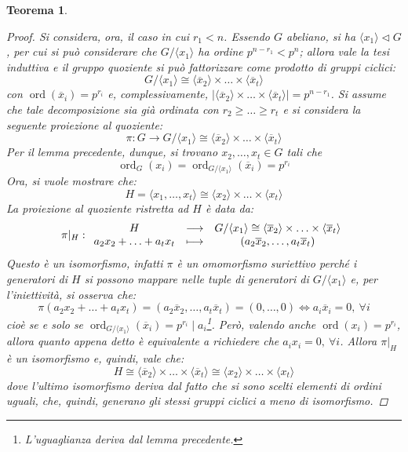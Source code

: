 \documentclass[11pt]{scrartcl}
\theoremstyle{style1}
\newtheorem{teorema}{Teorema}[section]
\numberwithin{equation}{subsection}
\begin{document}
\begin{teorema}
\begin{proof}
		Si considera, ora, il caso in cui $r_1<n$.
		Essendo $G$ abeliano, si ha $\langle x_1 \rangle \lhd G$, per cui si pu\`o considerare che $G / \langle x_1 \rangle$ ha ordine $p^{n-r_1} < p^n$; allora vale la tesi induttiva e il gruppo quoziente si pu\`o fattorizzare come prodotto di gruppi ciclici:
		\[
		G / \langle x_1 \rangle \cong \langle \overline{x}_2 \rangle\times \ldots\times \langle \overline{x}_t \rangle
		\] 
		con $\operatorname{ord}(\overline{x}_i) = p^{r_i} $ e, complessivamente, $\lvert \langle \overline{x}_2 \rangle\times \ldots\times \langle \overline{x}_t \rangle \rvert=p^{n-r_1}  $.
		Si assume che tale decomposizione sia gi\`a ordinata con $r_2\ge \ldots\ge r_t$ e si considera la seguente proiezione al quoziente:
		\[
		\pi : G \to G / \langle x_1 \rangle \cong \langle \overline{x}_2 \rangle\times \ldots\times \langle \overline{x}_t \rangle
		\] 
		Per il lemma precedente, dunque, si trovano $x_2,\ldots,x_t \in G$ tali che 
		\[
		\operatorname{ord}_G(x_i) =\operatorname{ord}_{G/\langle x_1 \rangle} (\overline{x}_i) = p^{r_i} 
		\] 
		Ora, si vuole mostrare che:
\[
H = \langle x_1,\ldots,x_t \rangle\cong \langle x_2 \rangle\times \ldots\times \langle x_t \rangle
\] 
La proiezione al quoziente ristretta ad $H$ \`e data da:
\[
\pi|_{H}  : 
	\begin{array}
		{c c c}
		H &\longrightarrow& G / \langle x_1 \rangle\cong \langle \overline{x}_2 \rangle\times \ldots\times \langle \overline{x}_t \rangle\\
		a_2x_2+\ldots+a_tx_t&\longmapsto& (a_2\overline{x}_2,\ldots,a_t \overline{x}_t)
	\end{array}
\] 
Questo \`e un isomorfismo, infatti $\pi$ \`e un omomorfismo suriettivo perch\'e i generatori di $H$ si possono mappare nelle tuple  di generatori di $G / \langle x_1 \rangle$ e, per l'iniettivit\`a, si osserva che:
\[
\pi(a_2x_2+ \ldots+a_t x_t) = (a_2\overline{x}_2,\ldots,a_t \overline{x}_t)= (0,\ldots,0) \iff a_i \overline{x}_i = 0, \ \forall i
\] 
cio\`e se e solo se $\operatorname{ord}_{G/\langle x_1 \rangle} (\overline{x}_i) = p^{r_i}  \mid a_i $\footnote{L'uguaglianza deriva dal lemma precedente.}.
Per\`o, valendo anche $\operatorname{ord}(x_i) =p^{r_i} $, allora quanto appena detto \`e equivalente a richiedere che $a_i x_ i= 0 , \ \forall i$.
Allora $\pi|_{H} $ \`e un isomorfismo e, quindi, vale che:
\[
H \cong \langle \overline{x}_2 \rangle\times \ldots \times \langle \overline{x}_t \rangle \cong \langle x_2 \rangle\times \ldots\times \langle x_t \rangle
\] 
dove l'ultimo isomorfismo deriva dal fatto che si sono scelti elementi di ordini uguali, che, quindi, generano gli stessi gruppi ciclici a meno di isomorfismo.


\end{proof}
\end{teorema}
\end{document}
